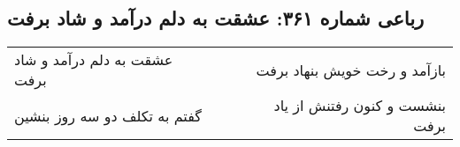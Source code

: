 \begin{center}
\section*{رباعی شماره ۳۶۱: عشقت به دلم درآمد و شاد برفت}
\label{sec:0361}
\begin{longtable}{l p{0.5cm} r}
عشقت به دلم درآمد و شاد برفت
&&
بازآمد و رخت خویش بنهاد برفت
\\
گفتم به تکلف دو سه روز بنشین
&&
بنشست و کنون رفتنش از یاد برفت
\\
\end{longtable}
\end{center}

